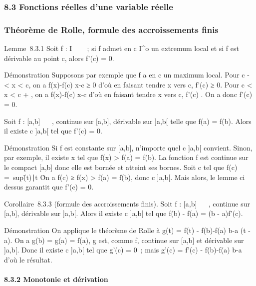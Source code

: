 
\subsubsection{8.3 Fonctions réelles d'une variable réelle}

\subsubsection{Théorème de Rolle, formule des accroissements finis}
\label{sec:theoreme-de-rolle}



Lemme~8.3.1 Soit f : I \rightarrow~ ~~; si f admet en c \in I^o un
extremum local et si f est dérivable au point c, alors f'(c) = 0.

Démonstration Supposons par exemple que f a en c un maximum local. Pour
c - \eta < x < c, on a  f(x)-f(c)
\over x-c ≥ 0 d'où en faisant tendre x vers c, f'(c) ≥
0. Pour c < x < c + \eta, on a  f(x)-f(c)
\over x-c  d'où en faisant tendre x vers c, f'(c) . On a donc f'(c) = 0.

\begin{thm}[Rolle]
   Soit f : [a,b] \rightarrow~ ~, continue sur [a,b],
dérivable sur ]a,b[ telle que f(a) = f(b). Alors il existe c
\in]a,b[ tel que f'(c) = 0.

\end{thm}
Démonstration Si f est constante sur [a,b], n'importe quel c
\in]a,b[ convient. Sinon, par exemple, il existe x \in [a,b] tel que
f(x) > f(a) = f(b). La fonction f est continue sur le
compact [a,b] donc elle est bornée et atteint ses bornes. Soit c \in
[a,b] tel que f(c) =\
sup\f(t)∣t \in
[a,b]\. On a f(c) ≥ f(x) > f(a) =
f(b), donc c \in]a,b[. Mais alors, le lemme ci dessus garantit que
f'(c) = 0.

Corollaire~8.3.3 (formule des accroissements finis). Soit f : [a,b]
\rightarrow~ \mathbb{R}~, continue sur [a,b], dérivable sur ]a,b[. Alors il existe c
\in]a,b[ tel que f(b) - f(a) = (b - a)f'(c).

Démonstration On applique le théorème de Rolle à g(t) = f(t) -
f(b)-f(a) \over b-a (t - a). On a g(b) = g(a) = f(a), g
est, comme f, continue sur [a,b] et dérivable sur ]a,b[. Donc il
existe c \in]a,b[ tel que g'(c) = 0~; mais g'(c) = f'(c) - f(b)-f(a)
\over b-a d'où le résultat.

\paragraph{8.3.2 Monotonie et dérivation}

